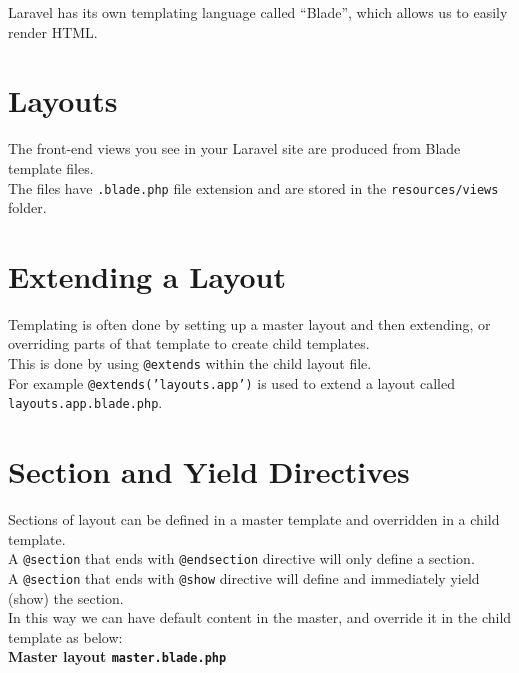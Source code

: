 Laravel has its own templating language called ``Blade'', which allows us to easily render HTML.
\\





\section{Layouts}

The front-end views you see in your Laravel site are produced from Blade template files.
\\

The files have \texttt{.blade.php} file extension and are stored in the \texttt{resources/views} folder.
\\

\section{Extending a Layout}

Templating is often done by setting up a master layout and then extending, or overriding parts of that template to create child templates.
\\

This is done by using \texttt{@extends} within the child layout file.
\\

For example \texttt{@extends('layouts.app')} is used to extend a layout called \texttt{layouts.app.blade.php}.


\section{Section and Yield Directives}

Sections of layout can be defined in a master template and overridden in a child template.
\\

A \texttt{@section} that ends with \texttt{@endsection} directive will only define a section.
\\

A \texttt{@section} that ends with \texttt{@show} directive will define and immediately yield (show) the section.
\\

In this way we can have default content in the master, and override it in the child template as below:
\\

\textbf{Master layout \texttt{master.blade.php}}

